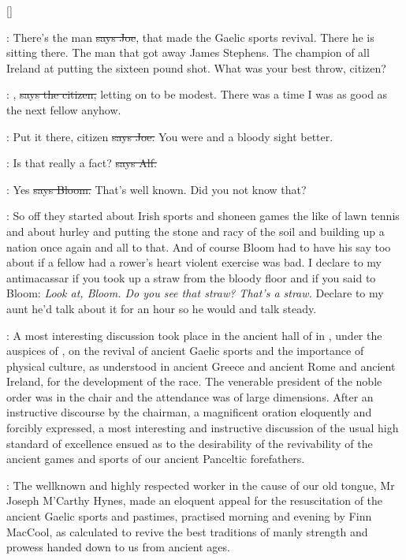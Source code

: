 []

\joe:
There's the man
\sout{says Joe},
that made the Gaelic sports revival.
There he
is sitting there.
The man that got away James Stephens.
The champion of
all Ireland at putting the sixteen pound shot.
What was your best throw,
citizen?

\citizen:
,
\sout{says the citizen,}
letting on to be modest.
There was a time
I was as good as the next fellow anyhow.

\joe:
Put it there,
citizen
\sout{says Joe.}
You were and a bloody sight better.

\bergan:
Is that really a fact?
\sout{says Alf.}

\Bloom:
Yes
\sout{says Bloom.}
That's well known.
Did you not know that?

\Nq:
So off they started about Irish sports and shoneen games the like of lawn
tennis and about hurley
and putting the stone and racy of the soil and
building up a nation once again and all to that.
And of course Bloom had
to have his say too about if a fellow had a rower's heart violent
exercise was bad.
I declare to my antimacassar if you took up a
straw from the bloody floor and if you said to Bloom:
\emph{Look at,
Bloom.
Do you see that straw?
That's a straw.} Declare to my aunt he'd talk
about it for an hour so he would and talk steady.

:
A most interesting discussion took place in the ancient hall of
 in ,
under the auspices of ,
on the revival of ancient Gaelic sports and the importance of
physical culture,
as understood in ancient Greece and ancient Rome and
ancient Ireland,
for the development of the race.
The venerable president
of the noble order was in the chair and the attendance was of large
dimensions.
After an instructive discourse by the chairman,
a magnificent
oration eloquently and forcibly expressed,
a most interesting and
instructive discussion of the usual high standard of excellence
ensued as to the desirability of the revivability of the ancient
games and sports of our ancient Panceltic forefathers.

:
The wellknown and highly respected worker in the cause of our old
tongue,
Mr Joseph M'Carthy Hynes,
made an eloquent appeal for
the resuscitation of the ancient Gaelic sports and pastimes,
practised morning and evening by Finn MacCool,
as calculated to revive the
best traditions of manly strength and prowess handed down to us from
ancient ages.

